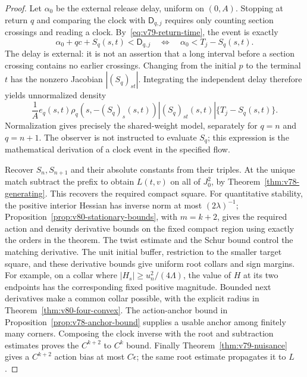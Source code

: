 \begin{proof}
Let $\alpha_0$ be the external release delay, uniform on $(0,A)$.
Stopping at return $q$ and comparing the clock with $\mathsf D_{q,j}$
requires only counting section crossings and reading a clock.
By~\eqref{eq:v79-return-time}, the event is exactly
\[
           \alpha_0+qc+S_q(s,t)<\mathsf D_{q,j}
               \quad\Longleftrightarrow\quad
                    \alpha_0<T_j-S_q(s,t).
\]
The delay is external: it is not an assertion that a long interval
before a section crossing contains no earlier crossings.  Changing
from the initial $p$ to the terminal $t$ has the nonzero Jacobian
$|(S_q)_{st}|$.  Integrating the independent delay therefore yields
unnormalized density
\[
 \frac1A e_q(s,t)\rho_q(s,-(S_q)_s(s,t))
             |(S_q)_{st}(s,t)|\{T_j-S_q(s,t)\}.
\]
Normalization gives precisely the shared-weight model, separately
for $q=n$ and $q=n+1$.  The observer is not instructed to evaluate
$S_q$; this expression is the mathematical derivation of a clock event
in the specified flow.

Recover $S_n,S_{n+1}$ and their absolute constants from their triples.
At the unique match subtract the prefix to obtain $L(t,v)$ on all of
$J_0^2$, by Theorem~\ref{thm:v78-generating}.  This recovers the
required compact square.  For quantitative stability, the positive
interior Hessian has inverse norm at most $(2\lambda)^{-1}$;
Proposition~\ref{prop:v80-stationary-bounds}, with $m=k+2$, gives
the required action and density derivative bounds on the fixed compact
region using exactly the orders in the theorem.  The twist estimate and the Schur bound
control the matching derivative.  The unit initial buffer, restriction
to the smaller target square, and these derivative bounds give uniform
root collars and sign margins.  For example, on a collar where
$|H_s|\ge u_n^2/(4\Lambda)$, the value of $H$ at its two endpoints
has the corresponding fixed positive magnitude.  Bounded next
derivatives make a common collar possible, with the explicit radius
in Theorem~\ref{thm:v80-four-convex}.  The action-anchor bound
in Proposition~\ref{prop:v78-anchor-bound} supplies a usable anchor
among finitely many corners.  Composing the clock inverse with the
root and subtraction estimates proves the $C^{k+2}$ to $C^k$ bound.
Finally Theorem~\ref{thm:v79-nuisance} gives a $C^{k+2}$ action bias
at most $C\epsilon$; the same root estimate propagates it to $L$.
\end{proof}

